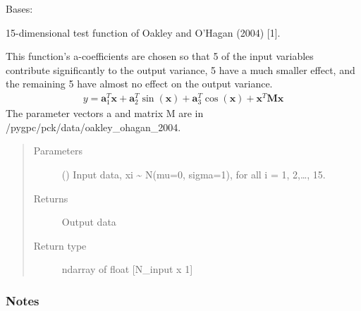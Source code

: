 \documentclass[letterpaper,10pt,english,openany,oneside]{sphinxmanual}
\begin{document}
\begin{fulllineitems}
\label{\detokenize{pygpc.testfunctions:pygpc.testfunctions.testfunctions.OakleyOhagan2004}}
Bases: {\hyperref[\detokenize{pygpc:pygpc.AbstractModel.AbstractModel}]{}}

15-dimensional test function of Oakley and O’Hagan (2004) {[}1{]}.

This function’s a-coefficients are chosen so that 5 of the input
variables contribute significantly to the output variance, 5 have a
much smaller effect, and the remaining 5 have almost no effect on the
output variance.
\begin{equation*}
\begin{split}y = \mathbf{a}_1^T\mathbf{x} + \mathbf{a}_2^T \sin(\mathbf{x}) + \mathbf{a}_3^T \cos(\mathbf{x}) +
\mathbf{x}^T\mathbf{M}\mathbf{x}\end{split}
\end{equation*}
The parameter vectors a and matrix M are in /pygpc/pck/data/oakley\_ohagan\_2004.
\begin{quote}\begin{description}
\item[{Parameters}] \leavevmode
{}\sphinxstyleliteralstrong{\sphinxupquote{{[}}}\sphinxstyleliteralstrong{\sphinxupquote{{]}}} (\sphinxstyleliteralemphasis{\sphinxupquote{ {[}}}\sphinxstyleliteralemphasis{\sphinxupquote{{]}}}) \textendash{} Input data, xi \textasciitilde{} N(mu=0, sigma=1), for all i = 1, 2,…, 15.

\item[{Returns}] \leavevmode
{} \textendash{} Output data

\item[{Return type}] \leavevmode
ndarray of float {[}N\_input x 1{]}

\end{description}\end{quote}
\subsubsection*{Notes}


\end{fulllineitems}
\end{document}
